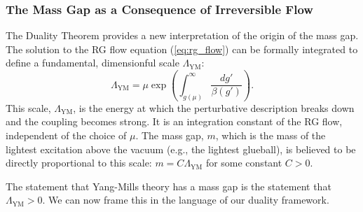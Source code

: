 \subsubsection{The Mass Gap as a Consequence of Irreversible Flow}
The Duality Theorem provides a new interpretation of the origin of the mass gap. The solution to the RG flow equation (\cref{eq:rg_flow}) can be formally integrated to define a fundamental, dimensionful scale $\Lambda_{\text{YM}}$:
\begin{equation}
    \Lambda_{\text{YM}} = \mu \exp\left( \int_{g(\mu)}^\infty \frac{dg'}{\beta(g')} \right).
\end{equation}
This scale, $\Lambda_{\text{YM}}$, is the energy at which the perturbative description breaks down and the coupling becomes strong. It is an integration constant of the RG flow, independent of the choice of $\mu$. The mass gap, $m$, which is the mass of the lightest excitation above the vacuum (e.g., the lightest glueball), is believed to be directly proportional to this scale: $m = C \Lambda_{\text{YM}}$ for some constant $C>0$.

The statement that Yang-Mills theory has a mass gap is the statement that $\Lambda_{\text{YM}} > 0$. We can now frame this in the language of our duality framework.

